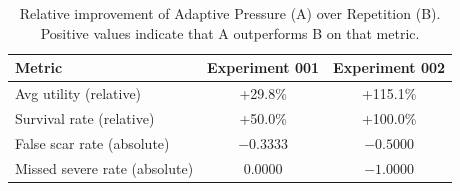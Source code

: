 \begin{table}[h]
\centering
\caption{%
Relative improvement of Adaptive Pressure (A) over Repetition (B).
Positive values indicate that A outperforms B on that metric.
}
\label{tab:deltas}
\small
\begin{tabular}{lcc}
\hline
\textbf{Metric} & \textbf{Experiment 001} & \textbf{Experiment 002} \\
\hline
Avg utility (relative) & +29.8\% & +115.1\% \\
Survival rate (relative) & +50.0\% & +100.0\% \\
False scar rate (absolute) & $-0.3333$ & $-0.5000$ \\
Missed severe rate (absolute) & $0.0000$ & $-1.0000$ \\
\hline
\end{tabular}
\end{table}
